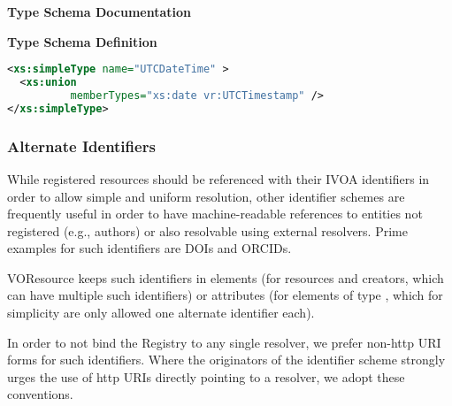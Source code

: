 \documentclass[11pt,a4paper]{ivoa}
\begin{document}
\begin{generated}
\begingroup
        \renewcommand*\descriptionlabel[1]{%
        \hbox to 5.5em{\emph{#1}\hfil}}\vspace{2ex}\noindent\textbf{ Type Schema Documentation}


\vspace{1ex}\noindent\textbf{ Type Schema Definition}

\begin{lstlisting}[language=XML,basicstyle=\footnotesize]
<xs:simpleType name="UTCDateTime" >
  <xs:union
          memberTypes="xs:date vr:UTCTimestamp" />
</xs:simpleType>
\end{lstlisting}\endgroup
\end{generated}


\subsubsection{Alternate Identifiers}
\label{sect:altidform}

While registered resources should be referenced with their IVOA
identifiers in order to allow simple and uniform resolution, other
identifier schemes are frequently useful in order to have
machine-readable references to entities not registered (e.g., authors)
or also resolvable using external resolvers.  Prime examples for such
identifiers are DOIs and ORCIDs.

VOResource keeps such identifiers in  elements (for
resources and creators, which can have multiple such identifiers) or
attributes (for elements of type , which for
simplicity are only allowed one alternate identifier each).

In order to not bind the Registry to any single resolver, we prefer
non-http URI forms for such identifiers.  Where the originators of the
identifier scheme strongly urges the use of http URIs directly pointing to
a resolver, we adopt these conventions.
\end{document}
